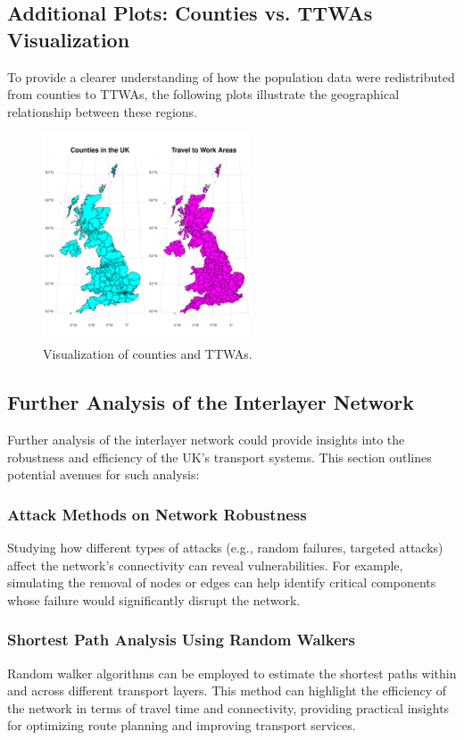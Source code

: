 \subsection*{Additional Plots: Counties vs. TTWAs Visualization}
To provide a clearer understanding of how the population data were redistributed from counties to TTWAs, the following plots illustrate the geographical relationship between these regions.

\begin{figure}[H]
    \centering
    \includegraphics[width=0.55\textwidth]{images/ttwasandcounties.pdf}
    \caption{Visualization of counties and TTWAs.}
\end{figure}

\subsection*{Further Analysis of the Interlayer Network}
Further analysis of the interlayer network could provide insights into the robustness and efficiency of the UK's transport systems. This section outlines potential avenues for such analysis:

\subsubsection*{Attack Methods on Network Robustness}
Studying how different types of attacks (e.g., random failures, targeted attacks) affect the network's connectivity can reveal vulnerabilities. For example, simulating the removal of nodes or edges can help identify critical components whose failure would significantly disrupt the network.

\subsubsection*{Shortest Path Analysis Using Random Walkers}
Random walker algorithms can be employed to estimate the shortest paths within and across different transport layers. This method can highlight the efficiency of the network in terms of travel time and connectivity, providing practical insights for optimizing route planning and improving transport services.

